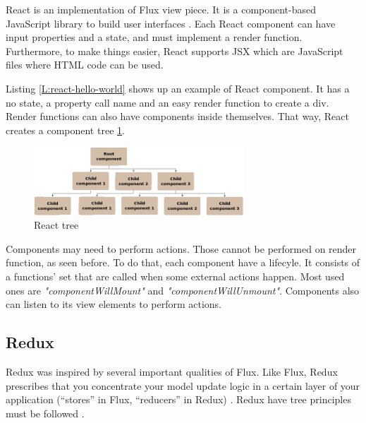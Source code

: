 React is an implementation of Flux view piece. It is a component-based 
JavaScript library to build user interfaces \cite{react-web}. Each React
component can have input properties and a state, and must implement a render
function. Furthermore, to make things easier, React supports JSX which are
JavaScript files where HTML code can be used.


\begin{codefigure}
\end{codefigure}

Listing \ref{L:react-hello-world} shows up an example of React component. It has
a no state, a property call name and an easy render function to create a div.
Render functions can also have components inside themselves. That way, React
creates a component tree \ref{F:react-tree}.

\begin{figure}[htb]
	\begin{center}
		\includegraphics[width=0.7\textwidth]{./figures/react-tree.png}
		\caption{React tree}
		\label{F:react-tree}
	\end{center}
\end{figure}

Components may need to perform actions. Those cannot be performed on render 
function, as seen before. To do that, each component have a lifecyle. It 
consists of a functions' set that are called when some external actions happen. 
Most used ones are \textit{"componentWillMount"} and 
\textit{"componentWillUnmount"}. Components also can listen to its view
elements to perform actions.

\subsection{Redux}

Redux was inspired by several important qualities of Flux. Like Flux, Redux
prescribes that you concentrate your model update logic in a certain layer of
your application (“stores” in Flux, “reducers” in Redux) \cite{redux-prior-art}.
Redux have tree principles must be followed \cite{redux-principles}.


